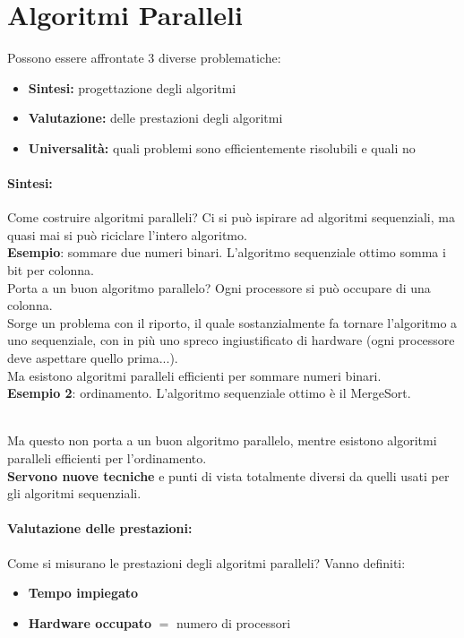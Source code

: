 \section{Algoritmi Paralleli}

Possono essere affrontate 3 diverse problematiche:
\begin{itemize}
	\item \textbf{Sintesi:} progettazione degli algoritmi 
	\item \textbf{Valutazione:} delle prestazioni degli algoritmi
	\item \textbf{Universalità:} quali problemi sono efficientemente risolubili e quali no
\end{itemize}

\paragraph{Sintesi:} Come costruire algoritmi paralleli? Ci si può ispirare ad algoritmi sequenziali, ma quasi mai si può riciclare l'intero algoritmo.\\

\textbf{Esempio}: sommare due numeri binari. L'algoritmo sequenziale ottimo somma i bit per colonna.\\

Porta a un buon algoritmo parallelo? Ogni processore si può occupare di una colonna.\\
Sorge un problema con il riporto, il quale sostanzialmente fa tornare l'algoritmo a uno sequenziale, con in più uno spreco ingiustificato di hardware (ogni processore deve aspettare quello prima...).\\
Ma esistono algoritmi paralleli efficienti per sommare numeri binari.\\

\textbf{Esempio 2}: ordinamento. L'algoritmo sequenziale ottimo è il MergeSort.\\\

Ma questo non porta a un buon algoritmo parallelo, mentre esistono algoritmi paralleli efficienti per l'ordinamento.\\

\textbf{Servono nuove tecniche} e punti di vista totalmente diversi da quelli usati per gli algoritmi sequenziali.\\

\newpage

\paragraph{Valutazione delle prestazioni:} Come si misurano le prestazioni degli algoritmi paralleli? Vanno definiti:
\begin{itemize}
	\item \textbf{Tempo impiegato}
	\item \textbf{Hardware occupato} $=$ numero di processori
\end{itemize}

